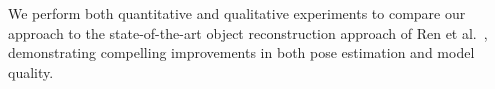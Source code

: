 
We perform both quantitative and qualitative experiments to compare our approach to the state-of-the-art object reconstruction approach of Ren et al.\ \cite{Ren2013}, demonstrating compelling improvements in both pose estimation and model quality.


